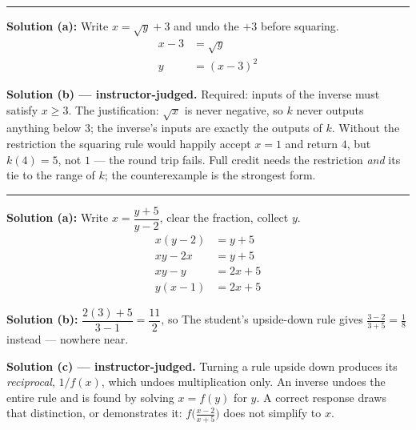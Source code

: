 \documentclass[12pt]{article}
\begin{document}
\vspace{0.2cm}\noindent\rule{\linewidth}{0.2pt}


\textbf{Solution (a):} Write $x = \sqrt{y} + 3$ and undo the $+3$ before squaring.
\begin{align*}
  x - 3 &= \sqrt{y} \\
  y &= (x - 3)^2
\end{align*}

\vspace{0.15cm}
\textbf{Solution (b) --- instructor-judged.} Required: inputs of the inverse must satisfy
$x \ge 3$. The justification: $\sqrt{x}$ is never negative, so $k$ never outputs anything
below $3$; the inverse's inputs are exactly the outputs of $k$. Without the restriction the
squaring rule would happily accept $x = 1$ and return $4$, but $k(4) = 5$, not $1$ --- the
round trip fails. Full credit needs the restriction \emph{and} its tie to the range of $k$;
the counterexample is the strongest form.

\vspace{0.2cm}\noindent\rule{\linewidth}{0.2pt}


\textbf{Solution (a):} Write $x = \dfrac{y + 5}{y - 2}$, clear the fraction, collect $y$.
\begin{align*}
  x(y - 2) &= y + 5 \\
  xy - 2x &= y + 5 \\
  xy - y &= 2x + 5 \\
  y(x - 1) &= 2x + 5
\end{align*}

\textbf{Solution (b):} $\dfrac{2(3) + 5}{3 - 1} = \dfrac{11}{2}$, so 
The student's upside-down rule gives $\frac{3-2}{3+5} = \frac{1}{8}$ instead --- nowhere near.

\vspace{0.15cm}
\textbf{Solution (c) --- instructor-judged.} Turning a rule upside down produces its
\emph{reciprocal}, $1/f(x)$, which undoes multiplication only. An inverse undoes the entire
rule and is found by solving $x = f(y)$ for $y$. A correct response draws that distinction,
or demonstrates it: $f\bigl(\frac{x-2}{x+5}\bigr)$ does not simplify to $x$.
\end{document}
